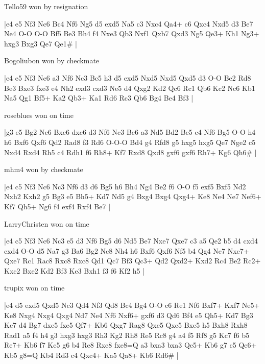 \showboard

Tello59 won by resignation

\makegametitle
|e4 e5 Nf3 Nc6 Bc4 Nf6 Ng5 d5 exd5 Na5 c3 Nxc4 Qa4+ c6 Qxc4 Nxd5 d3 Be7 Ne4 O-O O-O Bf5 Be3 Bh4 f4 Nxe3 Qb3 Nxf1 Qxb7 Qxd3 Ng5 Qe3+ Kh1 Ng3+ hxg3 Bxg3 Qe7 Qe1\#  |

\showboard

Bogoliubon won by checkmate

\makegametitle
|e4 e5 Nf3 Nc6 a3 Nf6 Nc3 Bc5 h3 d5 exd5 Nxd5 Nxd5 Qxd5 d3 O-O Be2 Rd8 Be3 Bxe3 fxe3 e4 Nh2 exd3 cxd3 Ne5 d4 Qxg2 Kd2 Qc6 Rc1 Qb6 Kc2 Nc6 Kb1 Na5 Qg1 Bf5+ Ka2 Qb3+ Ka1 Rd6 Rc3 Qb6 Bg4 Be4 Bf3  |

\showboard

roseblues won on time

\makegametitle
|g3 e5 Bg2 Nc6 Bxc6 dxc6 d3 Nf6 Nc3 Be6 a3 Nd5 Bd2 Bc5 e4 Nf6 Bg5 O-O h4 h6 Bxf6 Qxf6 Qd2 Rad8 f3 Rd6 O-O-O Bd4 g4 Rfd8 g5 hxg5 hxg5 Qe7 Nge2 c5 Nxd4 Rxd4 Rh5 c4 Rdh1 f6 Rh8+ Kf7 Rxd8 Qxd8 gxf6 gxf6 Rh7+ Kg6 Qh6\#  |

\showboard

mhm4 won by checkmate

\makegametitle
|e4 c5 Nf3 Nc6 Nc3 Nf6 d3 d6 Bg5 h6 Bh4 Ng4 Be2 f6 O-O f5 exf5 Bxf5 Nd2 Nxh2 Kxh2 g5 Bg3 e5 Bh5+ Kd7 Nd5 g4 Bxg4 Bxg4 Qxg4+ Ke8 Ne4 Ne7 Nef6+ Kf7 Qh5+ Ng6 f4 exf4 Rxf4 Be7  |

\showboard

LarryChristen won on time

\makegametitle
|e4 c5 Nf3 Nc6 Nc3 e5 d3 Nf6 Bg5 d6 Nd5 Be7 Nxe7 Qxe7 c3 a5 Qe2 b5 d4 cxd4 cxd4 O-O d5 Na7 g3 Ba6 Bg2 Nc8 Nh4 h6 Bxf6 Qxf6 Nf5 b4 Qg4 Ne7 Nxe7+ Qxe7 Rc1 Rac8 Rxc8 Rxc8 Qd1 Qc7 Bf3 Qc3+ Qd2 Qxd2+ Kxd2 Rc4 Be2 Rc2+ Kxc2 Bxe2 Kd2 Bf3 Ke3 Bxh1 f3 f6 Kf2 h5  |

\showboard

trupix won on time

\makegametitle
|e4 d5 exd5 Qxd5 Nc3 Qd4 Nf3 Qd8 Bc4 Bg4 O-O c6 Re1 Nf6 Bxf7+ Kxf7 Ne5+ Ke8 Nxg4 Nxg4 Qxg4 Nd7 Ne4 Nf6 Nxf6+ gxf6 d3 Qd6 Bf4 e5 Qh5+ Kd7 Bg3 Kc7 d4 Bg7 dxe5 fxe5 Qf7+ Kb6 Qxg7 Rag8 Qxe5 Qxe5 Bxe5 h5 Bxh8 Rxh8 Rad1 a5 f4 h4 g3 hxg3 hxg3 Rh3 Kg2 Rh8 Re5 Rc8 g4 a4 f5 Rf8 g5 Kc7 f6 b5 Re7+ Kb6 f7 Kc5 g6 b4 Re8 Rxe8 fxe8=Q a3 bxa3 bxa3 Qe5+ Kb6 g7 c5 Qe6+ Kb5 g8=Q Kb4 Rd3 c4 Qxc4+ Ka5 Qa8+ Kb6 Rd6\#  |

